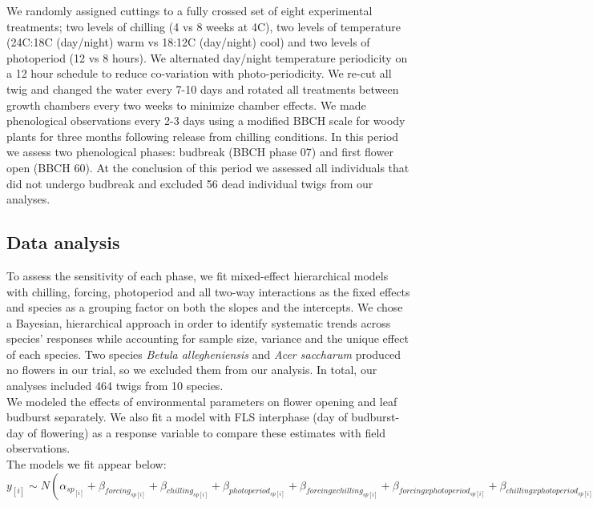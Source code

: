 \documentclass[11pt]{article}
\begin{document}
\noindent We randomly assigned cuttings to a fully crossed set of eight experimental treatments; two levels of chilling (4 vs 8 weeks at 4\degree C), two levels of temperature (24\degree C:18\degree C (day/night) warm vs 18\degree:12\degree C (day/night) cool) and two levels of photoperiod (12 vs 8 hours). We alternated day/night temperature periodicity on a 12 hour schedule to reduce co-variation with photo-periodicity. We re-cut all twig and changed the water every 7-10 days and rotated all treatments between growth chambers every two weeks to minimize chamber effects. We made phenological observations every 2-3 days using a modified BBCH scale for woody plants \citep{Finn2007} for three months following release from chilling conditions. In this period we assess two phenological phases: budbreak (BBCH phase 07) %
and first flower open (BBCH 60). At the conclusion of this period we assessed all individuals that did not undergo budbreak and excluded 56 dead individual twigs from our analyses. %

\subsection*{Data analysis}
\noindent To assess the sensitivity of each phase, we fit mixed-effect hierarchical models with chilling, forcing, photoperiod and all two-way interactions as the fixed effects and species as a grouping factor on both the slopes and the intercepts. We chose a Bayesian, hierarchical approach in order to identify systematic trends across species' responses while accounting for sample size, variance and the unique effect of each species. Two species \textit{Betula allegheniensis} and \textit{Acer saccharum} produced no flowers in our trial, so we excluded them from our analysis. In total, our analyses included 464 twigs from 10 species. \\

\noident We modeled the effects of environmental parameters on flower opening and leaf budburst separately. We also fit a model with FLS interphase (day of budburst- day of flowering) as a response variable to compare these estimates with field observations.\\

The models we fit appear below:\\

$y_{[i]} \sim N(\alpha_{sp_{[i]}}+\beta_{forcing_{sp[i]}}+\beta_{chilling_{sp[i]}}+\beta_{photoperiod_{sp[i]}}+\beta_{forcing x chilling_{sp[i]}}+\beta_{forcing x photoperiod_{sp[i]}}+\beta_{chilling x photoperiod_{sp[i]}})$\\
\end{document}
